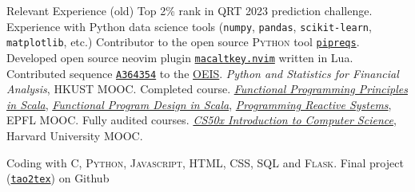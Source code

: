 
\begin{rubric}{Relevant Experience (old)}
  \entry*[2023] Top 2\% rank in QRT 2023 prediction challenge. Experience with Python data science tools (\texttt{numpy}, \texttt{pandas}, \texttt{scikit-learn}, \texttt{matplotlib}, etc.)  
  \entry*[2023] Contributor to the open source \textsc{Python} tool \href{https://github.com/bndr/pipreqs}{\texttt{pipreqs}}. 
  \entry*[2023] Developed open source neovim plugin \href{https://github.com/clvnkhr/macaltkey.nvim}{\texttt{macaltkey.nvim}} written in Lua.
  \entry*[2023] Contributed sequence \href{https://oeis.org/A364354}{\texttt{A364354}} to the \href{https://oeis.org/A364354}{\textsc{OEIS}}.
  \entry*[2023] \emph{Python and Statistics for Financial Analysis}, HKUST MOOC. Completed course.
\entry*[2022]  \href{https://www.coursera.org/learn/scala-functional-programming/}{\emph{Functional Programming Principles in Scala}},  \href{https://www.coursera.org/learn/scala-functional-program-design/}{\emph{Functional Program Design in Scala}}, \href{https://www.coursera.org/learn/scala-akka-reactive/}{\emph{Programming Reactive Systems}}, EPFL MOOC. Fully audited courses.
\entry*[2022] \href{https://certificates.cs50.io/61d7b5aa-582d-49e7-ada4-c7cd0b965c9b.pdf?size=letter}{\emph{CS50x Introduction to Computer Science}}, Harvard University MOOC. \par Coding with \textsc{C, Python, Javascript, HTML, CSS, SQL} and \textsc{Flask}. Final project (\href{https://github.com/clvnkhr/tao2tex}{\texttt{tao2tex}}) on Github
%


\end{rubric}
